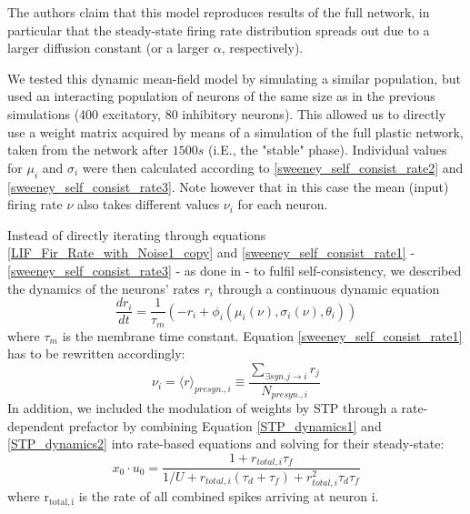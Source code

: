 \documentclass[10pt,a4paper]{article}
\begin{document}
The authors claim that this model reproduces results of the full network, in particular that the steady-state firing rate distribution spreads out due to a larger diffusion constant (or a larger $\alpha$, respectively).

We tested this dynamic mean-field model by simulating a similar population, but used an interacting population of neurons of the same size as in the previous simulations (400 excitatory, 80 inhibitory neurons). This allowed us to directly use a weight matrix acquired by means of a simulation of the full plastic network, taken from the network after $1500s$ (i.E., the "stable" phase).
Individual values for $\mu_i$ and $\sigma_i$ were then calculated according to \eqref{sweeney_self_consist_rate2} and \eqref{sweeney_self_consist_rate3}. Note however that in this case the mean (input) firing rate $\nu$ also takes different values $\nu_i$ for each neuron.

Instead of directly iterating through equations \eqref{LIF_Fir_Rate_with_Noise1_copy} and \eqref{sweeney_self_consist_rate1} - \eqref{sweeney_self_consist_rate3} - as done in \cite{Sweeney_Paper} - to fulfil self-consistency, we described the dynamics of the neurons' rates $r_i$ through a continuous dynamic equation
\begin{equation}
\frac{dr_i}{dt} = \frac{1}{\tau_m} \left( -r_i + \phi_i(\mu_i(\nu),\sigma_i(\nu),\theta_i) \right)
\label{dyn_rate_equation}
\end{equation}
where $\tau_m$ is the membrane time constant. Equation \eqref{sweeney_self_consist_rate1} has to be rewritten accordingly:
\begin{equation}
\nu_i = {\langle r \rangle}_{presyn.,i} \equiv \frac{\sum_{\exists syn. j\rightarrow i} r_j}{N_{presyn., i}}
\label{sweeney_self_consist_rate1_mod}
\end{equation}
In addition, we included the modulation of weights by STP through a rate-dependent prefactor by combining Equation \eqref{STP_dynamics1} and \eqref{STP_dynamics2} into rate-based equations and solving for their steady-state:
\begin{equation}
x_{0}\cdot u_{0} = \frac{1+r_{total,i} \tau_f}{1/U + r_{total,i} (\tau_d + \tau_f)+ r_{total,i}^2 \tau_d \tau_f}
\label{STP_steady}
\end{equation}
where $\mathrm{r_{total,i}}$ is the rate of all combined spikes arriving at neuron i.
\end{document}
